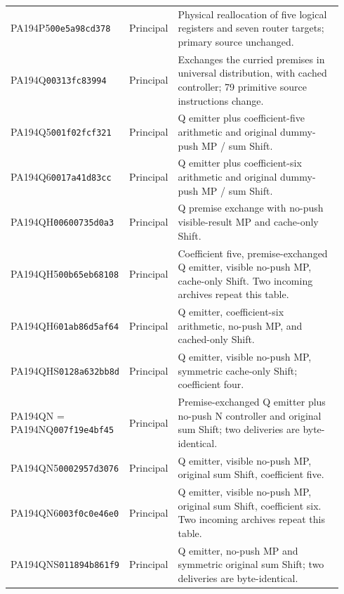 {\begin{longtable}{@{}p{0.23\linewidth}p{0.13\linewidth}p{0.58\linewidth}@{}}
PA194P5\newline\texttt{00e5a98cd378} & Principal & Physical reallocation of five logical registers and seven router targets; primary source unchanged.\\[2.5pt]
PA194Q\newline\texttt{00313fc83994} & Principal & Exchanges the curried premises in universal distribution, with cached controller; 79 primitive source instructions change.\\[2.5pt]
PA194Q5\newline\texttt{001f02fcf321} & Principal & Q emitter plus coefficient-five arithmetic and original dummy-push MP / sum Shift.\\[2.5pt]
PA194Q6\newline\texttt{0017a41d83cc} & Principal & Q emitter plus coefficient-six arithmetic and original dummy-push MP / sum Shift.\\[2.5pt]
PA194QH\newline\texttt{00600735d0a3} & Principal & Q premise exchange with no-push visible-result MP and cache-only Shift.\\[2.5pt]
PA194QH5\newline\texttt{00b65eb68108} & Principal & Coefficient five, premise-exchanged Q emitter, visible no-push MP, cache-only Shift. Two incoming archives repeat this table.\\[2.5pt]
PA194QH6\newline\texttt{01ab86d5af64} & Principal & Q emitter, coefficient-six arithmetic, no-push MP, and cached-only Shift.\\[2.5pt]
PA194QHS\newline\texttt{0128a632bb8d} & Principal & Q emitter, visible no-push MP, symmetric cache-only Shift; coefficient four.\\[2.5pt]
PA194QN = PA194NQ\newline\texttt{007f19e4bf45} & Principal & Premise-exchanged Q emitter plus no-push N controller and original sum Shift; two deliveries are byte-identical.\\[2.5pt]
PA194QN5\newline\texttt{0002957d3076} & Principal & Q emitter, visible no-push MP, original sum Shift, coefficient five.\\[2.5pt]
PA194QN6\newline\texttt{003f0c0e46e0} & Principal & Q emitter, visible no-push MP, original sum Shift, coefficient six. Two incoming archives repeat this table.\\[2.5pt]
PA194QNS\newline\texttt{011894b861f9} & Principal & Q emitter, no-push MP and symmetric original sum Shift; two deliveries are byte-identical.\\[2.5pt]

\end{longtable}}
